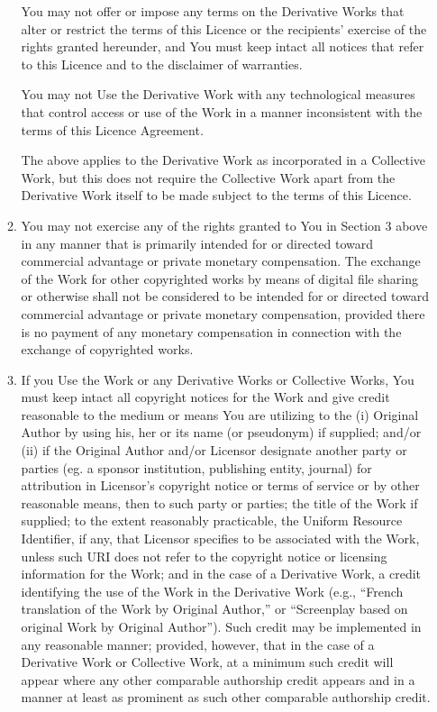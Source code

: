 \begin{enumerate}
\begin{enumerate}
            You may not offer or impose any terms on the Derivative Works that alter or restrict the terms of this Licence or the recipients' exercise of the rights granted hereunder, and You must keep intact all notices that refer to this Licence and to the disclaimer of warranties.

            You may not Use the Derivative Work with any technological measures that control access or use of the Work in a manner inconsistent with the terms of this Licence Agreement.

            The above applies to the Derivative Work as incorporated in a Collective Work, but this does not require the Collective Work apart from the Derivative Work itself to be made subject to the terms of this Licence.

         \item You may not exercise any of the rights granted to You in Section 3 above in any manner that is primarily intended for or directed toward commercial advantage or private monetary compensation. The exchange of the Work for other copyrighted works by means of digital file sharing or otherwise shall not be considered to be intended for or directed toward commercial advantage or private monetary compensation, provided there is no payment of any monetary compensation in connection with the exchange of copyrighted works.
         \item If you Use the Work or any Derivative Works or Collective Works, You must keep intact all copyright notices for the Work and give credit reasonable to the medium or means You are utilizing to the (i) Original Author by using his, her or its name (or pseudonym) if supplied; and/or (ii) if the Original Author and/or Licensor designate another party or parties (eg. a sponsor institution, publishing entity, journal) for attribution in Licensor's copyright notice or terms of service or by other reasonable means, then to such party or parties; the title of the Work if supplied; to the extent reasonably practicable, the Uniform Resource Identifier, if any, that Licensor specifies to be associated with the Work, unless such URI does not refer to the copyright notice or licensing information for the Work; and in the case of a Derivative Work, a credit identifying the use of the Work in the Derivative Work (e.g., ``French translation of the Work by Original Author,'' or ``Screenplay based on original Work by Original Author''). Such credit may be implemented in any reasonable manner; provided, however, that in the case of a Derivative Work or Collective Work, at a minimum such credit will appear where any other comparable authorship credit appears and in a manner at least as prominent as such other comparable authorship credit.

\end{enumerate}
\end{enumerate}
